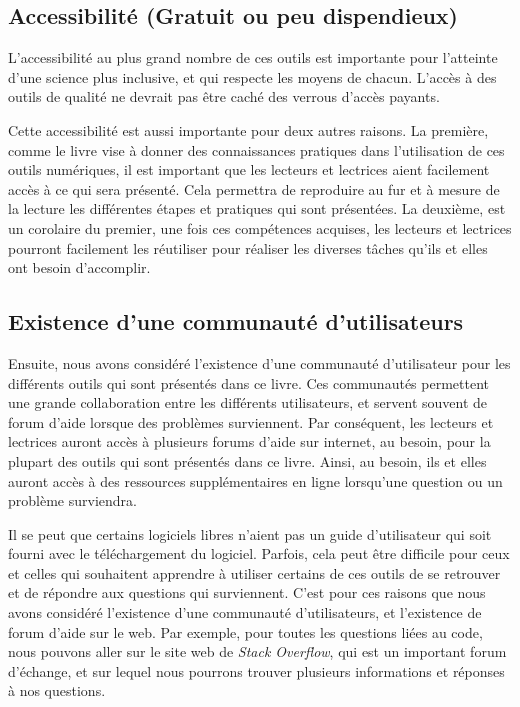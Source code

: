 \documentclass[
  letterpaper,
  DIV=11,
  numbers=noendperiod]{scrreprt}
\begin{document}
\hypertarget{accessibilituxe9-gratuit-ou-peu-dispendieux}{%
\subsection{Accessibilité (Gratuit ou peu
dispendieux)}\label{accessibilituxe9-gratuit-ou-peu-dispendieux}}

L'accessibilité au plus grand nombre de ces outils est importante pour
l'atteinte d'une science plus inclusive, et qui respecte les moyens de
chacun. L'accès à des outils de qualité ne devrait pas être caché des
verrous d'accès payants.

Cette accessibilité est aussi importante pour deux autres raisons. La
première, comme le livre vise à donner des connaissances pratiques dans
l'utilisation de ces outils numériques, il est important que les
lecteurs et lectrices aient facilement accès à ce qui sera présenté.
Cela permettra de reproduire au fur et à mesure de la lecture les
différentes étapes et pratiques qui sont présentées. La deuxième, est un
corolaire du premier, une fois ces compétences acquises, les lecteurs et
lectrices pourront facilement les réutiliser pour réaliser les diverses
tâches qu'ils et elles ont besoin d'accomplir.

\hypertarget{existence-dune-communautuxe9-dutilisateurs}{%
\subsection{Existence d'une communauté
d'utilisateurs}\label{existence-dune-communautuxe9-dutilisateurs}}

Ensuite, nous avons considéré l'existence d'une communauté d'utilisateur
pour les différents outils qui sont présentés dans ce livre. Ces
communautés permettent une grande collaboration entre les différents
utilisateurs, et servent souvent de forum d'aide lorsque des problèmes
surviennent. Par conséquent, les lecteurs et lectrices auront accès à
plusieurs forums d'aide sur internet, au besoin, pour la plupart des
outils qui sont présentés dans ce livre. Ainsi, au besoin, ils et elles
auront accès à des ressources supplémentaires en ligne lorsqu'une
question ou un problème surviendra.

Il se peut que certains logiciels libres n'aient pas un guide
d'utilisateur qui soit fourni avec le téléchargement du logiciel.
Parfois, cela peut être difficile pour ceux et celles qui souhaitent
apprendre à utiliser certains de ces outils de se retrouver et de
répondre aux questions qui surviennent. C'est pour ces raisons que nous
avons considéré l'existence d'une communauté d'utilisateurs, et
l'existence de forum d'aide sur le web. Par exemple, pour toutes les
questions liées au code, nous pouvons aller sur le site web de
\emph{Stack Overflow}, qui est un important forum d'échange, et sur
lequel nous pourrons trouver plusieurs informations et réponses à nos
questions.
\end{document}
